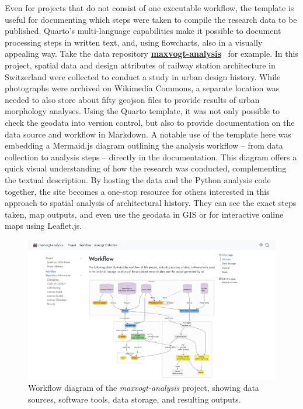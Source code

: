 \documentclass{anthology-ch}         %
\begin{document}
Even for projects that do not consist of one executable workflow, the template is useful for documenting which steps were taken to compile the research data to be published. Quarto's multi-language capabilities make it possible to document processing steps in written text, and, using flowcharts, also in a visually appealing way. Take the data repository \href{https://mtwente.github.io/maxvogt-analysis}{\textbf{maxvogt-analysis}}~\cite{twente2024} for example. In this project, spatial data and design attributes of railway station architecture in Switzerland were collected to conduct a study in urban design history. While photographs were archived on Wikimedia Commons, a separate location was needed to also store about fifty geojson files to provide results of urban morphology analyses. Using the Quarto template, it was not only possible to check the geodata into version control, but also to provide documentation on the data source and workflow in Markdown. A notable use of the template here was embedding a Mermaid.js diagram outlining the analysis workflow -- from data collection to analysis steps -- directly in the documentation. This diagram offers a quick visual understanding of how the research was conducted, complementing the textual description. By hosting the data and the Python analysis code together, the site becomes a one-stop resource for others interested in this approach to spatial analysis of architectural history. They can see the exact steps taken, map outputs, and even use the geodata in GIS or for interactive online maps using Leaflet.js.

\begin{figure}[t!]
  \centering
  \includegraphics[width=0.9\linewidth]{images/maxvogt_analysis.png}
  \caption{Workflow diagram of the \emph{maxvogt-analysis} project, showing data sources, software tools, data storage, and resulting outputs.}
  \label{fig-max-vogt}
\end{figure}
\end{document}
